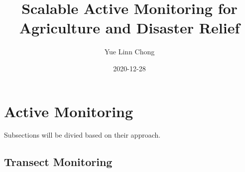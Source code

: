 \documentclass{article}
\title{Scalable Active Monitoring for Agriculture and Disaster Relief}
\date{2020-12-28}
\author{Yue Linn Chong}
\begin{document}
  \maketitle
  \newpage
  \section{Active Monitoring}
  Subsections will be divied based on their approach.
  \subsection{Transect Monitoring}
\end{document}

